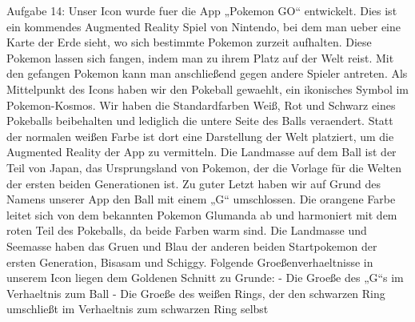 \documentclass{article}
\begin{document}
Aufgabe 14:
Unser Icon wurde fuer die App „Pokemon GO“ entwickelt. Dies ist ein kommendes Augmented Reality Spiel von Nintendo, bei dem man ueber eine Karte der Erde sieht, wo sich bestimmte Pokemon zurzeit aufhalten. Diese Pokemon lassen sich fangen, indem man zu ihrem Platz auf der Welt reist. Mit den gefangen Pokemon kann man anschließend gegen andere Spieler antreten.
Als Mittelpunkt des Icons haben wir den Pokeball gewaehlt, ein ikonisches Symbol im Pokemon-Kosmos. Wir haben die Standardfarben Weiß, Rot und Schwarz eines Pokeballs beibehalten und lediglich die untere Seite des Balls veraendert. Statt der normalen weißen Farbe ist dort eine Darstellung der Welt platziert, um die Augmented Reality der App zu vermitteln. Die Landmasse auf dem Ball ist der Teil von Japan, das Ursprungsland von Pokemon, der die Vorlage für die Welten der ersten beiden Generationen ist. Zu guter Letzt haben wir auf Grund des Namens unserer App den Ball mit einem „G“ umschlossen. Die orangene Farbe leitet sich von dem bekannten Pokemon Glumanda ab und harmoniert mit dem roten Teil des Pokeballs, da beide Farben warm sind. Die Landmasse und Seemasse haben das Gruen und Blau der anderen beiden Startpokemon der ersten Generation, Bisasam und Schiggy.
Folgende Groeßenverhaeltnisse in unserem Icon liegen dem Goldenen Schnitt zu Grunde:
-	Die Groeße des „G“s im Verhaeltnis zum Ball
-	Die Groeße des weißen Rings, der den schwarzen Ring umschließt im Verhaeltnis zum schwarzen Ring selbst
\end{document}
